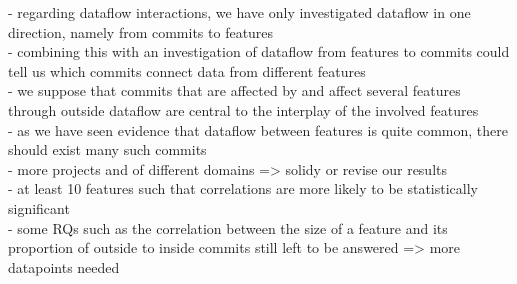 - regarding dataflow interactions, we have only investigated dataflow in one direction, namely from commits to features \\
- combining this with an investigation of dataflow from features to commits could tell us which commits connect data from different features \\
- we suppose that commits that are affected by and affect several features through outside dataflow are central to the interplay of the involved features \\
- as we have seen evidence that dataflow between features is quite common, there should exist many such commits \\

- more projects and of different domains => solidy or revise our results \\
- at least 10 features such that correlations are more likely to be statistically significant \\
- some RQs such as the correlation between the size of a feature and its proportion of outside to inside commits still left to be answered => more datapoints needed \\
\fi

